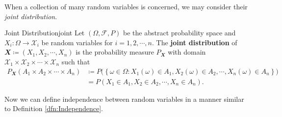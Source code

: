 \documentclass[math, code]{amznotes}
\theoremstyle{remark}
\begin{document}
When a collection of many random variables is concerned, we may consider their \textit{joint distribution}.
\begin{dfnbox}{Joint Distribution}{joint}
    Let $\left(\Omega, \mathcal{F}, P\right)$ be the abstract probability space and $X_i \colon \Omega \to \mathcal{X}_i$ be random variables for $i = 1, 2, \cdots, n$. The {\color{red} \textbf{joint distribution}} of $\mathbfit{X} \coloneqq \left(X_1, X_2, \cdots, X_n\right)$ is the probability measure $P_{\mathbfit{X}}$ with domain $\mathcal{X}_1 \times \mathcal{X}_2 \times \cdots \times \mathcal{X}_n$ such that 
    \begin{align*}
        P_{\mathbfit{X}}\left(A_1 \times A_2 \times \cdots \times A_n\right) & \coloneqq P\bigl(\left\{\omega \in \Omega \colon X_1\left(\omega\right) \in A_1, X_2\left(\omega\right) \in A_2, \cdots, X_n\left(\omega\right) \in A_n\right\}\bigr) \\
        & = P\left(X_1 \in A_1, X_2 \in A_2, \cdots, X_n \in A_n\right).
    \end{align*}
\end{dfnbox}
Now we can define independence between random variables in a manner similar to Definition \ref{dfn:Independence}.
\end{document}
